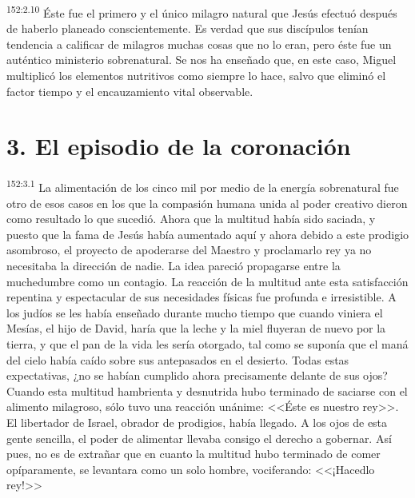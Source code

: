 \par 
\textsuperscript{152:2.10} Éste fue el primero y el único milagro natural que Jesús efectuó después de haberlo planeado conscientemente. Es verdad que sus discípulos tenían tendencia a calificar de milagros muchas cosas que no lo eran, pero éste fue un auténtico ministerio sobrenatural. Se nos ha enseñado que, en este caso, Miguel multiplicó los elementos nutritivos como siempre lo hace, salvo que eliminó el factor tiempo y el encauzamiento vital observable.

\section*{3. El episodio de la coronación}
\par 
\textsuperscript{152:3.1} La alimentación de los cinco mil por medio de la energía sobrenatural fue otro de esos casos en los que la compasión humana unida al poder creativo dieron como resultado lo que sucedió. Ahora que la multitud había sido saciada, y puesto que la fama de Jesús había aumentado aquí y ahora debido a este prodigio asombroso, el proyecto de apoderarse del Maestro y proclamarlo rey ya no necesitaba la dirección de nadie. La idea pareció propagarse entre la muchedumbre como un contagio. La reacción de la multitud ante esta satisfacción repentina y espectacular de sus necesidades físicas fue profunda e irresistible. A los judíos se les había enseñado durante mucho tiempo que cuando viniera el Mesías, el hijo de David, haría que la leche y la miel fluyeran de nuevo por la tierra, y que el pan de la vida les sería otorgado, tal como se suponía que el maná del cielo había caído sobre sus antepasados en el desierto. Todas estas expectativas, ¿no se habían cumplido ahora precisamente delante de sus ojos? Cuando esta multitud hambrienta y desnutrida hubo terminado de saciarse con el alimento milagroso, sólo tuvo una reacción unánime: <<Éste es nuestro rey>>. El libertador de Israel, obrador de prodigios, había llegado. A los ojos de esta gente sencilla, el poder de alimentar llevaba consigo el derecho a gobernar. Así pues, no es de extrañar que en cuanto la multitud hubo terminado de comer opíparamente, se levantara como un solo hombre, vociferando: <<¡Hacedlo rey!>>

